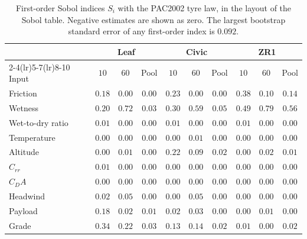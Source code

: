 \begin{table}[htbp]
\centering\small
\setlength{\tabcolsep}{4.2pt}
\caption{First-order Sobol indices $S_i$ with the PAC2002 tyre law, in the layout of the Sobol table. Negative estimates are shown as zero. The largest bootstrap standard error of any first-order index is $0.092$.}\label{tab:app-sobol-first}
\begin{tabular}{lccccccccc}
\toprule
& \multicolumn{3}{c}{Leaf} & \multicolumn{3}{c}{Civic} & \multicolumn{3}{c}{ZR1}\\
\cmidrule(lr){2-4}\cmidrule(lr){5-7}\cmidrule(lr){8-10}
Input & $10$ & $60$ & Pool & $10$ & $60$ & Pool & $10$ & $60$ & Pool\\
\midrule
Friction & $0.18$ & $0.00$ & $0.00$ & $0.23$ & $0.00$ & $0.00$ & $0.38$ & $0.10$ & $0.14$\\
Wetness & $0.20$ & $0.72$ & $0.03$ & $0.30$ & $0.59$ & $0.05$ & $0.49$ & $0.79$ & $0.56$\\
Wet-to-dry ratio & $0.01$ & $0.00$ & $0.00$ & $0.01$ & $0.00$ & $0.00$ & $0.01$ & $0.00$ & $0.00$\\
Temperature & $0.00$ & $0.00$ & $0.00$ & $0.00$ & $0.01$ & $0.00$ & $0.00$ & $0.00$ & $0.00$\\
Altitude & $0.00$ & $0.01$ & $0.00$ & $0.22$ & $0.09$ & $0.02$ & $0.00$ & $0.02$ & $0.01$\\
$C_{rr}$ & $0.01$ & $0.00$ & $0.00$ & $0.00$ & $0.00$ & $0.00$ & $0.00$ & $0.00$ & $0.00$\\
$C_DA$ & $0.00$ & $0.00$ & $0.00$ & $0.00$ & $0.00$ & $0.00$ & $0.00$ & $0.00$ & $0.00$\\
Headwind & $0.02$ & $0.05$ & $0.00$ & $0.00$ & $0.05$ & $0.00$ & $0.00$ & $0.00$ & $0.00$\\
Payload & $0.18$ & $0.02$ & $0.01$ & $0.02$ & $0.03$ & $0.00$ & $0.00$ & $0.01$ & $0.00$\\
Grade & $0.34$ & $0.22$ & $0.03$ & $0.13$ & $0.14$ & $0.02$ & $0.01$ & $0.00$ & $0.02$\\
\bottomrule
\end{tabular}
\end{table}

